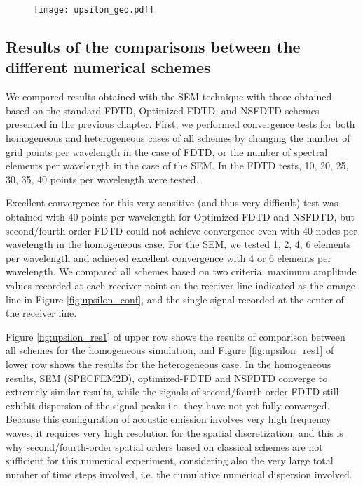     \begin{figure}[htbp]
            \centerline{\texttt{[image: upsilon\_geo.pdf]}}
        \label{fig:upsilon_geo}
    \end{figure}


    \subsection{Results of the comparisons between the different numerical schemes}

We compared results obtained with the SEM technique with those obtained based on the standard FDTD, Optimized-FDTD, and NSFDTD schemes presented in the previous chapter.
        First, we performed convergence tests for both homogeneous and heterogeneous cases of all schemes by changing the number of grid points per
wavelength in the case of FDTD, or the number of spectral elements per wavelength in the case of the SEM. In the FDTD tests, 10, 20, 25, 30, 35, 40 points per wavelength were tested.

Excellent convergence for this very sensitive (and thus very difficult) test was obtained with 40 points per wavelength
for Optimized-FDTD and NSFDTD, but second/fourth order FDTD could not achieve convergence even with
40 nodes per wavelength in the homogeneous case.
For the SEM, we tested 1, 2, 4, 6 elements per wavelength and achieved excellent convergence with 4 or 6 elements per wavelength.
        We compared all schemes based on two criteria: maximum amplitude values recorded at each receiver point on the receiver line indicated as the orange
line in Figure \ref{fig:upsilon_conf}, and the single signal recorded at the center of the receiver line.

        Figure \ref{fig:upsilon_res1} of upper row shows the results of comparison between all schemes for the homogeneous simulation, and Figure \ref{fig:upsilon_res1} of lower row shows the
results for the heterogeneous case. In the homogeneous results, SEM (SPECFEM2D), optimized-FDTD and NSFDTD converge to extremely similar results,
while the signals of second/fourth-order FDTD still exhibit dispersion of the signal peaks i.e. they have not yet fully converged.
Because this configuration of acoustic emission involves very high frequency
waves, it requires very high resolution for the spatial discretization, and this is why second/fourth-order spatial orders based on classical schemes
are not sufficient for this numerical experiment, considering also the very large total number of time steps involved, i.e. the cumulative numerical dispersion involved.

